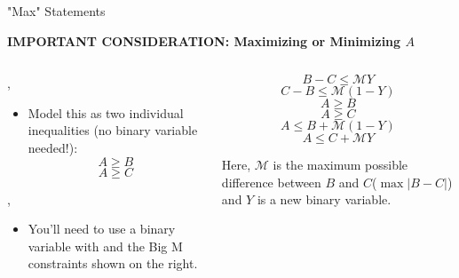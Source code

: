 \documentclass[10pt, aspectratio=169]{beamer}
\begin{document}
\begin{frame}[t]{"Max" Statements}
    \begin{center}
        \textbf{IMPORTANT CONSIDERATION: Maximizing or Minimizing $A$}
    \end{center}
    \begin{columns}[t]
        \begin{column}[t]{0.5\textwidth}
            \vspace{-.8cm}
            \begin{center}
                ,
                \underbar{}
            \end{center}
            \vspace{-0.4cm}
            \begin{itemize}
                \item Model this as two individual inequalities (no binary variable needed!):
                $$A \geq B$$
                $$A \geq C$$
            \end{itemize}
            \begin{center}
                ,
            \end{center}
            \begin{itemize}
                \item You'll need to use a binary variable with and the Big M constraints shown on the right.
            \end{itemize}
        \end{column}
        \begin{column}[t]{0.5\textwidth}
                $$B - C \leq \mathcal{M} Y$$
                $$C - B \leq \mathcal{M} (1-Y)$$
                $$A \geq B$$
                $$A \geq C$$
                $$A \leq B + \mathcal{M}(1-Y)$$
                $$A \leq C + \mathcal{M}Y$$

                Here, $\mathcal{M}$ is the maximum possible difference between $B$ and $C$($\max{\left|B-C\right|}$) and $Y$ is a new binary variable.
        \end{column}
    \end{columns}
\end{frame}
\end{document}
